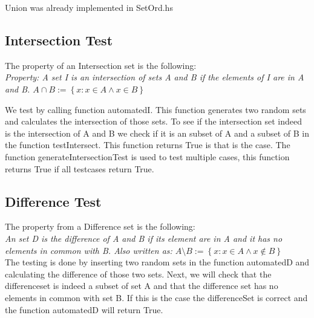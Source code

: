 \documentclass{article}
\begin{document}
Union was already implemented in SetOrd.hs\\

\subsection*{Intersection Test}
The property of an Intersection set is the following: \\
\emph{
Property: A set I is an intersection of sets A and B if the elements of I are in A and B.
$ A \cap B := \left\{ x: x \in A \land x \in B\right\} $ \\}

We test by calling function automatedI. This function generates two random sets and calculates the intersection of those sets. To see if the intersection set indeed is the intersection of A and B we check if it is an subset of A and a subset of B in the function testIntersect. This function returns True is that is the case. The function generateIntersectionTest is used to test multiple cases, this function returns True if all testcases return True.


\subsection*{Difference Test}
The property from a Difference set is the following:\\
 \emph{
An set D is the difference of A and B if its element are in A and it has no elements in common with B. Also written as:
$ A \setminus B := \left\{ x: x \in A \land x \not \in B\right\} $ }\\

The testing is done by inserting two random sets in the function automatedD and calculating the difference of those two sets. Next, we will check that the differenceset is indeed a subset of set A and that the difference set has no elements in common with set B. If this is the case the differenceSet is correct and the function automatedD will return True. 
\end{document}
